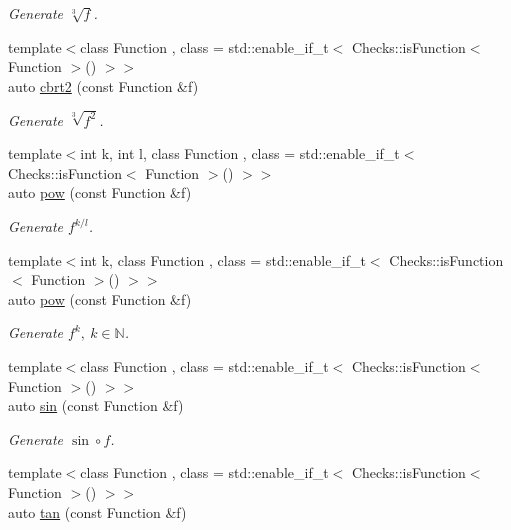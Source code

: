 \begin{DoxyCompactItemize}
\begin{DoxyCompactList}\small\item\em Generate $ \sqrt[3]{f} $. \end{DoxyCompactList}\item 
{\footnotesize template$<$class Function , class  = std\-::enable\-\_\-if\-\_\-t$<$ Checks\-::is\-Function$<$ Function $>$() $>$$>$ }\\auto \hyperlink{group__CMathGroup_ga3a4ba572754c0310c41949f2a4091046}{cbrt2} (const Function \&f)
\begin{DoxyCompactList}\small\item\em Generate $ \sqrt[3]{f^2}$. \end{DoxyCompactList}\item 
{\footnotesize template$<$int k, int l, class Function , class  = std\-::enable\-\_\-if\-\_\-t$<$ Checks\-::is\-Function$<$ Function $>$() $>$$>$ }\\auto \hyperlink{group__CMathGroup_gaa667967d67586d6d5fc733a978f9ab06}{pow} (const Function \&f)
\begin{DoxyCompactList}\small\item\em Generate $ f^{k/l} $. \end{DoxyCompactList}\item 
{\footnotesize template$<$int k, class Function , class  = std\-::enable\-\_\-if\-\_\-t$<$ Checks\-::is\-Function$<$ Function $>$() $>$$>$ }\\auto \hyperlink{group__CMathGroup_ga8e9aacbacd848ce8c87ceba957a666a7}{pow} (const Function \&f)
\begin{DoxyCompactList}\small\item\em Generate $ f^k,\ k\in\mathbb{N}$. \end{DoxyCompactList}\item 
{\footnotesize template$<$class Function , class  = std\-::enable\-\_\-if\-\_\-t$<$ Checks\-::is\-Function$<$ Function $>$() $>$$>$ }\\auto \hyperlink{group__CMathGroup_gace9a6a15d1fd5071d13272e57d096b2c}{sin} (const Function \&f)
\begin{DoxyCompactList}\small\item\em Generate $ \sin\circ f $. \end{DoxyCompactList}\item 
{\footnotesize template$<$class Function , class  = std\-::enable\-\_\-if\-\_\-t$<$ Checks\-::is\-Function$<$ Function $>$() $>$$>$ }\\auto \hyperlink{group__CMathGroup_ga12e1ac095ec148de81e84e58bcce5d21}{tan} (const Function \&f)

\end{DoxyCompactItemize}
